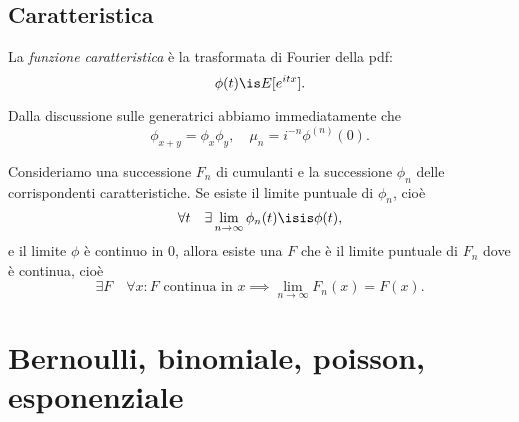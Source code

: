 \subsection{Caratteristica}

\begin{definition}
	La \emph{funzione caratteristica} è la trasformata di Fourier della pdf:
	\begin{equation*}
		\phi(t) \is E[e^{itx}].
	\end{equation*}
\end{definition}
Dalla discussione sulle generatrici abbiamo immediatamente che
\begin{equation*}
	\phi_{x+y} = \phi_x\phi_y, \quad \mu_n = i^{-n} \phi^{(n)}(0).
\end{equation*}

\begin{fact}
	\label{th:paullevy}
	Consideriamo una successione $F_n$ di cumulanti e la successione $\phi_n$ delle corrispondenti caratteristiche.
	Se esiste il limite puntuale di $\phi_n$, cioè
	\begin{equation*}
		\forall t \quad \exists \lim_{n\to\infty} \phi_n(t) \isis \phi(t),
	\end{equation*}
	e il limite $\phi$ è continuo in 0, allora
	esiste una $F$ che è il limite puntuale di $F_n$ dove è continua, cioè
	\begin{equation*}
		\exists F \quad \forall x: \text{$F$ continua in $x$} \implies
		\lim_{n\to\infty} F_n(x) = F(x).
	\end{equation*}
\end{fact}

\section{Bernoulli, binomiale, poisson, esponenziale}

